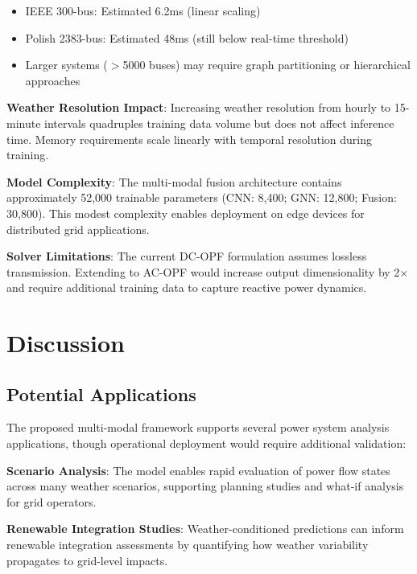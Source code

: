 \documentclass[journal,12pt,onecolumn]{IEEEtran}
\begin{document}
\begin{itemize}
    \item IEEE 300-bus: Estimated 6.2ms (linear scaling)
    \item Polish 2383-bus: Estimated 48ms (still below real-time threshold)
    \item Larger systems ($>$5000 buses) may require graph partitioning or hierarchical approaches
\end{itemize}

\textbf{Weather Resolution Impact}: Increasing weather resolution from hourly to 15-minute intervals quadruples training data volume but does not affect inference time. Memory requirements scale linearly with temporal resolution during training.

\textbf{Model Complexity}: The multi-modal fusion architecture contains approximately 52,000 trainable parameters (CNN: 8,400; GNN: 12,800; Fusion: 30,800). This modest complexity enables deployment on edge devices for distributed grid applications.

\textbf{Solver Limitations}: The current DC-OPF formulation assumes lossless transmission. Extending to AC-OPF would increase output dimensionality by 2× and require additional training data to capture reactive power dynamics.

\section{Discussion}
\label{sec:discussion}

\subsection{Potential Applications}

The proposed multi-modal framework supports several power system analysis applications, though operational deployment would require additional validation:

\textbf{Scenario Analysis}: The model enables rapid evaluation of power flow states across many weather scenarios, supporting planning studies and what-if analysis for grid operators.

\textbf{Renewable Integration Studies}: Weather-conditioned predictions can inform renewable integration assessments by quantifying how weather variability propagates to grid-level impacts.
\end{document}
